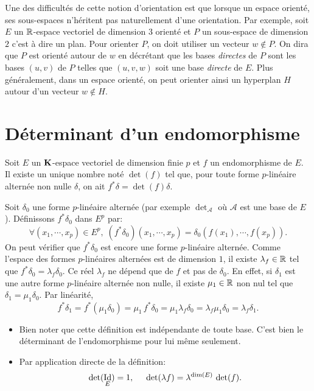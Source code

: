  Une des difficultés de cette notion d'orientation est que lorsque un espace orienté, ses sous-espaces n'héritent pas naturellement d'une orientation.\newline
{} Par exemple, soit $E$ un $\mathbb{R}$-espace vectoriel de dimension $3$ orienté et $P$ un sous-espace de dimension $2$ c'est à dire un plan. Pour orienter $P$, on doit utiliser un vecteur $w\notin P$.\newline
On dira que $P$ est orienté autour de $w$ en décrétant que les bases \emph{directes} de $P$ sont les bases $(u,v)$ de $P$ telles que $(u,v,w)$ soit une base \emph{directe} de $E$. Plus généralement, dans un espace orienté, on peut orienter ainsi un hyperplan $H$ autour d'un vecteur $w\notin H$.


\section{Déterminant d'un endomorphisme}
\begin{propdef}
 Soit $E$ un $\mathbf{K}$-espace vectoriel de dimension finie $p$ et $f$ un endomorphisme de $E$. Il existe un unique nombre noté $\det(f)$ tel que, pour toute forme $p$-linéaire alternée non nulle $\delta$, on ait $f^*\delta = \det(f) \delta$.
\end{propdef}
\begin{demo}
Soit $\delta_0$ une forme $p$-linéaire alternée (par exemple $\det_\mathcal{A}$ où $\mathcal{A}$ est une base de $E$). Définissons $f^*\delta_0$ dans $E^p$ par:
 \[
   \forall (x_1, \cdots, x_p)\in E^p, \; (f^*\delta_0)(x_1, \cdots, x_p) = \delta_0(f(x_1), \cdots, f(x_p)).
 \]
On peut vérifier que $f^*\delta_0$ est encore une forme $p$-linéaire alternée. Comme l'espace des formes $p$-linéaires alternées est de dimension $1$, il existe $\lambda_f \in \mathbb{R}$ tel que $f^*\delta_0 = \lambda_f \delta_0$. Ce réel $\lambda_f$ ne dépend que de $f$ et pas de $\delta_0$. En effet, si $\delta_1$ est une autre forme $p$-linéaire alternée non nulle, il existe $\mu_1 \in \mathbb{R}$ non nul tel que $\delta_1 = \mu_1 \delta_0$. Par linéarité,
\[
  f^*\delta_1 = f^*(\mu_1\delta_0) = \mu_1\, f^* \delta_0 = \mu_1 \lambda_f \delta_0 = \lambda_f \mu_1 \delta_0 = \lambda_f \delta_1. 
\]
\end{demo}
\begin{rems}
\begin{itemize}
  \item Bien noter que cette définition est indépendante de toute base. C'est bien le déterminant de l'endomorphisme pour lui même seulement.
  \item Par application directe de la définition:
\[
  \det(\mathop{\mathrm{Id}}_E) = 1,\hspace{0.5cm} \det(\lambda f) = \lambda^{\dim(E)}\, \det(f).
\]
\end{itemize}
\end{rems}
